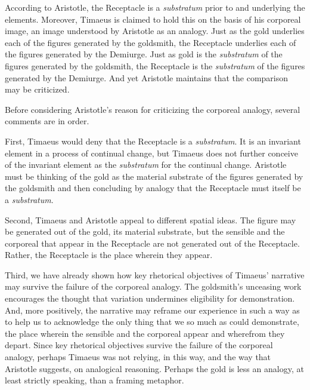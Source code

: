 According to Aristotle, the Receptacle is a \emph{substratum} prior to and underlying the elements. Moreover, Timaeus is claimed to hold this on the basis of his corporeal image, an image understood by Aristotle as an analogy. Just as the gold underlies each of the figures generated by the goldsmith, the Receptacle underlies each of the figures generated by the Demiurge. Just as gold is the \emph{substratum} of the figures generated by the goldsmith, the Receptacle is the \emph{substratum} of the figures generated by the Demiurge. And yet Aristotle maintains that the comparison may be criticized.

Before considering Aristotle's reason for criticizing the corporeal analogy, several comments are in order. 

First, Timaeus would deny that the Receptacle is a \emph{substratum}. It is an invariant element in a process of continual change, but Timaeus does not further conceive of the invariant element as the \emph{substratum} for the continual change. Aristotle must be thinking of the gold as the material substrate of the figures generated by the goldsmith and then concluding by analogy that the Receptacle must itself be a \emph{substratum}. 

Second, Timaeus and Aristotle appeal to different spatial ideas. The figure may be generated out of the gold, its material substrate, but the sensible and the corporeal that appear in the Receptacle are not generated out of the Receptacle. Rather, the Receptacle is the place wherein they appear. 

Third, we have already shown how key rhetorical objectives of Timaeus' narrative may survive the failure of the corporeal analogy. The goldsmith's unceasing work encourages the thought that variation undermines eligibility for demonstration. And, more positively, the narrative may reframe our experience in such a way as to help us to acknowledge the only thing that we so much as could demonstrate, the place wherein the sensible and the corporeal appear and wherefrom they depart. Since key rhetorical objectives survive the failure of the corporeal analogy, perhaps Timaeus was not relying, in this way, and the way that Aristotle suggests, on analogical reasoning. Perhaps the gold is less an analogy, at least strictly speaking, than a framing metaphor. 

